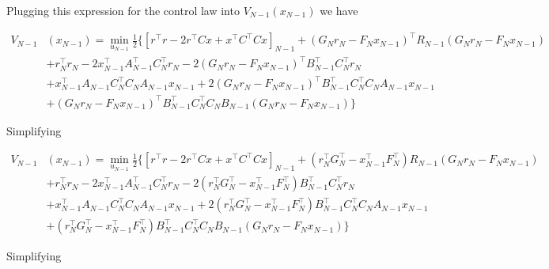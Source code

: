 \documentclass[11pt,letterpaper,onecolumn,notitlepage]{article}
\begin{document}
Plugging this expression for the control law into $V_{N-1}(x_{N-1})$ we have

\begin{equation*}
  \begin{split}
    V_{N-1}&(x_{N-1})=\min_{u_{N-1}}\frac{1}{2}\biggr\{
    \left[r^{\top}r-2r^{\top}Cx+x^{\top}C^{\top}Cx\right]_{N-1}+(G_{N}r_{N}-F_{N}x_{N-1})^{\top}R_{N-1}(G_{N}r_{N}-F_{N}x_{N-1}) \\
    &+r_{N}^{\top}r_{N}
    -2x_{N-1}^{\top}A_{N-1}^{\top}C_{N}^{\top}r_{N}-2(G_{N}r_{N}-F_{N}x_{N-1})^{\top}B_{N-1}^{\top}C_{N}^{\top}r_{N} \\
    &+x_{N-1}^{\top}A_{N-1}C_{N}^{\top}C_{N}A_{N-1}x_{N-1}
    +2(G_{N}r_{N}-F_{N}x_{N-1})^{\top}B_{N-1}^{\top}C_{N}^{\top}C_{N}A_{N-1}x_{N-1} \\
    &+(G_{N}r_{N}-F_{N}x_{N-1})^{\top}B_{N-1}^{\top}C_{N}^{\top}C_{N}B_{N-1}(G_{N}r_{N}-F_{N}x_{N-1})
    \biggr\}
  \end{split}
\end{equation*}

Simplifying

\begin{equation*}
  \begin{split}
    V_{N-1}&(x_{N-1})=\min_{u_{N-1}}\frac{1}{2}\biggr\{
    \left[r^{\top}r-2r^{\top}Cx+x^{\top}C^{\top}Cx\right]_{N-1}
    +(r_{N}^{\top}G_{N}^{\top}-x_{N-1}^{\top}F_{N}^{\top})R_{N-1}(G_{N}r_{N}-F_{N}x_{N-1}) \\
    &+r_{N}^{\top}r_{N}
    -2x_{N-1}^{\top}A_{N-1}^{\top}C_{N}^{\top}r_{N}
    -2(r_{N}^{\top}G_{N}^{\top}-x_{N-1}^{\top}F_{N}^{\top})B_{N-1}^{\top}C_{N}^{\top}r_{N} \\
    &+x_{N-1}^{\top}A_{N-1}C_{N}^{\top}C_{N}A_{N-1}x_{N-1}
    +2(r_{N}^{\top}G_{N}^{\top}-x_{N-1}^{\top}F_{N}^{\top})B_{N-1}^{\top}C_{N}^{\top}C_{N}A_{N-1}x_{N-1} \\
    &+(r_{N}^{\top}G_{N}^{\top}-x_{N-1}^{\top}F_{N}^{\top})B_{N-1}^{\top}C_{N}^{\top}C_{N}B_{N-1}(G_{N}r_{N}-F_{N}x_{N-1})
    \biggr\}
  \end{split}
\end{equation*}

Simplifying
\end{document}
